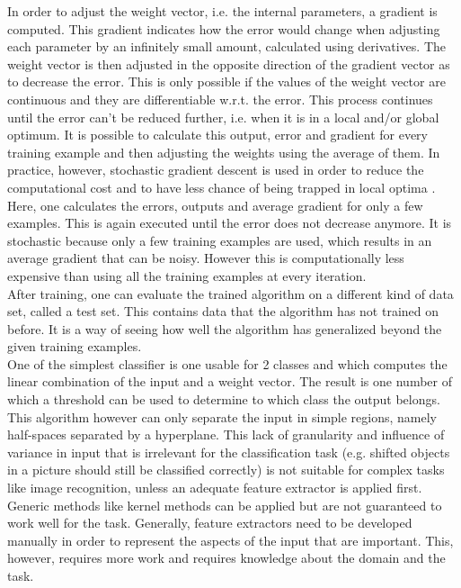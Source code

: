 \documentclass[a4paper]{article}
\begin{document}
In order to adjust the weight vector, i.e. the internal parameters, a gradient is computed. This gradient indicates how the error would change when adjusting each parameter by an infinitely small amount, calculated using derivatives. The weight vector is then adjusted in the opposite direction of the gradient vector as to decrease the error. This is only possible if the values of the weight vector are continuous and they are differentiable w.r.t. the error.
This process continues until the error can't be reduced further, i.e. when it is in a local and/or global optimum.
It is possible to calculate this output, error and gradient for every training example and then adjusting the weights using the average of them.
In practice, however, stochastic gradient descent is used in order to reduce the computational cost and to have less chance of being trapped in local optima \citep{ML}.
Here, one calculates the errors, outputs and average gradient for only a few examples. This is again executed until the error does not decrease anymore. It is stochastic because only a few training examples are used, which results in an average gradient that can be noisy. However this is computationally less expensive than using all the training examples at every iteration.\\
After training, one can evaluate the trained algorithm on a different kind of data set, called a test set. This contains data that the algorithm has not trained on before. It is a way of seeing how well the algorithm has generalized beyond the given training examples.\\

One of the simplest classifier is one usable for 2 classes and which computes the linear combination of the input and a weight vector. The result is one number of which a threshold can be used to determine to which class the output belongs. This algorithm however can only separate the input in simple regions, namely half-spaces separated by a hyperplane. This lack of granularity and influence of variance in input that is irrelevant for the classification task (e.g. shifted objects in a picture should still be classified correctly) is not suitable for complex tasks like image recognition, unless an adequate feature extractor is applied first. Generic methods like kernel methods can be applied but are not guaranteed to work well for the task. Generally, feature extractors need to be developed manually in order to represent the aspects of the input that are important. This, however, requires more work and requires knowledge about the domain and the task.
\end{document}
